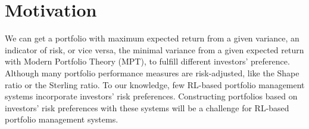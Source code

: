 \section {Motivation}
We can get a portfolio with maximum expected return from a given variance, an indicator of risk, or vice versa, the minimal variance from a given expected return with Modern Portfolio Theory (MPT), \cite{10.2307/2975974} to fulfill different investors' preference.
Although many portfolio performance measures are risk-adjusted\cite{cogneau2009101}, like the Shape ratio\cite{Sharpe49} or the Sterling ratio\cite{magdon2004maximum}. To our knowledge, few RL-based portfolio management systems incorporate investors' risk preferences. Constructing portfolios based on investors' risk preferences with these systems will be a challenge for RL-based portfolio management systems.